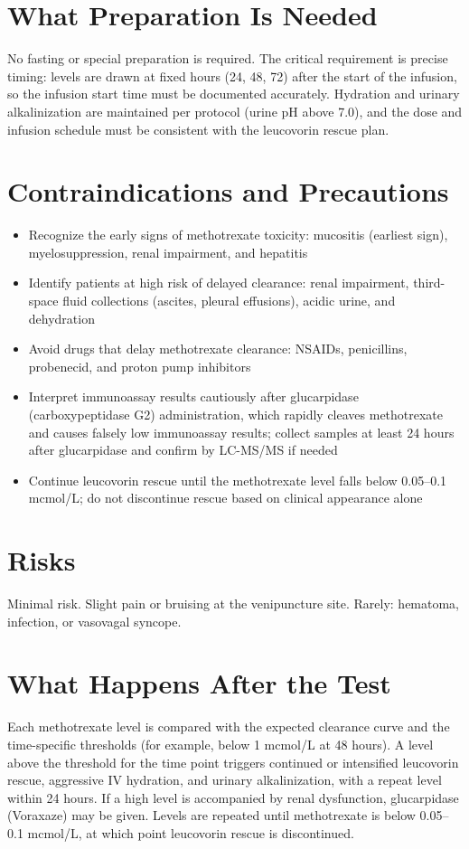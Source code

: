\section*{What Preparation Is Needed}
No fasting or special preparation is required. The critical requirement is precise timing: levels are drawn at fixed hours (24, 48, 72) after the start of the infusion, so the infusion start time must be documented accurately. Hydration and urinary alkalinization are maintained per protocol (urine pH above 7.0), and the dose and infusion schedule must be consistent with the leucovorin rescue plan.
\section*{Contraindications and Precautions}
\begin{itemize}
  \item Recognize the early signs of methotrexate toxicity: mucositis (earliest sign), myelosuppression, renal impairment, and hepatitis
  \item Identify patients at high risk of delayed clearance: renal impairment, third-space fluid collections (ascites, pleural effusions), acidic urine, and dehydration
  \item Avoid drugs that delay methotrexate clearance: NSAIDs, penicillins, probenecid, and proton pump inhibitors
  \item Interpret immunoassay results cautiously after glucarpidase (carboxypeptidase G2) administration, which rapidly cleaves methotrexate and causes falsely low immunoassay results; collect samples at least 24 hours after glucarpidase and confirm by LC-MS/MS if needed
  \item Continue leucovorin rescue until the methotrexate level falls below 0.05--0.1 mcmol/L; do not discontinue rescue based on clinical appearance alone
\end{itemize}
\section*{Risks}
Minimal risk. Slight pain or bruising at the venipuncture site. Rarely: hematoma, infection, or vasovagal syncope.
\section*{What Happens After the Test}
Each methotrexate level is compared with the expected clearance curve and the time-specific thresholds (for example, below 1 mcmol/L at 48 hours). A level above the threshold for the time point triggers continued or intensified leucovorin rescue, aggressive IV hydration, and urinary alkalinization, with a repeat level within 24 hours. If a high level is accompanied by renal dysfunction, glucarpidase (Voraxaze) may be given. Levels are repeated until methotrexate is below 0.05--0.1 mcmol/L, at which point leucovorin rescue is discontinued.
